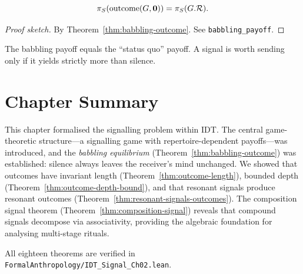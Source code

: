 \begin{theorem}
\label{thm:babbling-payoff}
\[
  \pi_S(\operatorname{outcome}(G, \mathbf{0}))
  = \pi_S(G.\mathcal{R}).
\]
\end{theorem}

\begin{proof}[Proof sketch]
By Theorem~\ref{thm:babbling-outcome}.
See \texttt{babbling\_payoff}.
\end{proof}

\begin{remark}
The babbling payoff equals the ``status quo'' payoff.  A signal is worth
sending only if it yields strictly more than silence.
\end{remark}

\section*{Chapter Summary}

This chapter formalised the signalling problem within IDT\@.  The central
game-theoretic structure---a signalling game with repertoire-dependent
payoffs---was introduced, and the \emph{babbling equilibrium}
(Theorem~\ref{thm:babbling-outcome}) was established: silence always
leaves the receiver's mind unchanged.  We showed that outcomes have
invariant length (Theorem~\ref{thm:outcome-length}), bounded depth
(Theorem~\ref{thm:outcome-depth-bound}), and that resonant signals
produce resonant outcomes (Theorem~\ref{thm:resonant-signals-outcomes}).
The composition signal theorem (Theorem~\ref{thm:composition-signal})
reveals that compound signals decompose via associativity, providing the
algebraic foundation for analysing multi-stage rituals.

All eighteen theorems are verified in
\texttt{FormalAnthropology/IDT\_Signal\_Ch02.lean}.
